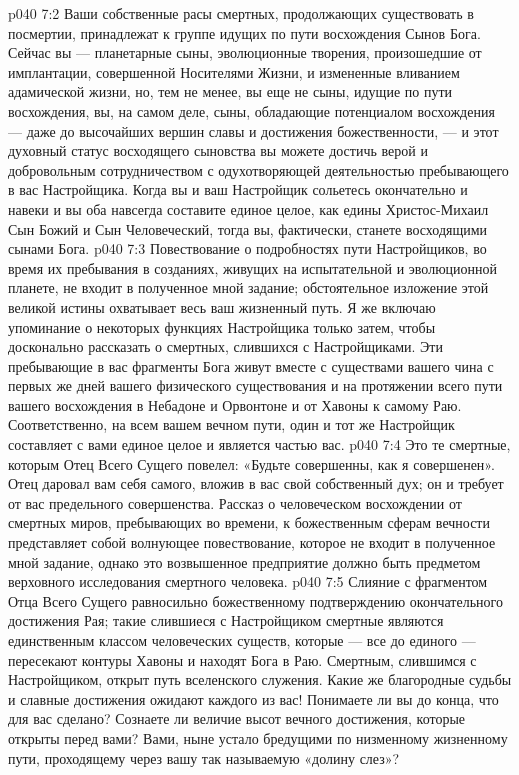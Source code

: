\vs p040 7:2 Ваши собственные расы смертных, продолжающих существовать в посмертии, принадлежат к группе идущих по пути восхождения Сынов Бога. Сейчас вы --- планетарные сыны, эволюционные творения, произошедшие от имплантации, совершенной Носителями Жизни, и измененные вливанием адамической жизни, но, тем не менее, вы еще не сыны, идущие по пути восхождения, вы, на самом деле, сыны, обладающие потенциалом восхождения --- даже до высочайших вершин славы и достижения божественности, --- и этот духовный статус восходящего сыновства вы можете достичь верой и добровольным сотрудничеством с одухотворяющей деятельностью пребывающего в вас Настройщика. Когда вы и ваш Настройщик сольетесь окончательно и навеки и вы оба навсегда составите единое целое, как едины Христос\hyp{}Михаил Сын Божий и Сын Человеческий, тогда вы, фактически, станете восходящими сынами Бога.
\vs p040 7:3 Повествование о подробностях пути Настройщиков, во время их пребывания в созданиях, живущих на испытательной и эволюционной планете, не входит в полученное мной задание; обстоятельное изложение этой великой истины охватывает весь ваш жизненный путь. Я же включаю упоминание о некоторых функциях Настройщика только затем, чтобы досконально рассказать о смертных, слившихся с Настройщиками. Эти пребывающие в вас фрагменты Бога живут вместе с существами вашего чина с первых же дней вашего физического существования и на протяжении всего пути вашего восхождения в Небадоне и Орвонтоне и от Хавоны к самому Раю. Соответственно, на всем вашем вечном пути, один и тот же Настройщик составляет с вами единое целое и является частью вас.
\vs p040 7:4 Это те смертные, которым Отец Всего Сущего повелел: «Будьте совершенны, как я совершенен». Отец даровал вам себя самого, вложив в вас свой собственный дух;  он и требует от вас предельного совершенства. Рассказ о человеческом восхождении от смертных миров, пребывающих во времени, к божественным сферам вечности представляет собой волнующее повествование, которое не входит в полученное мной задание, однако это возвышенное предприятие должно быть предметом верховного исследования смертного человека.
\vs p040 7:5 Слияние с фрагментом Отца Всего Сущего равносильно божественному подтверждению окончательного достижения Рая; такие слившиеся с Настройщиком смертные являются единственным классом человеческих существ, которые --- все до единого --- пересекают контуры Хавоны и находят Бога в Раю. Смертным, слившимся с Настройщиком, открыт путь вселенского служения. Какие же благородные судьбы и славные достижения ожидают каждого из вас! Понимаете ли вы до конца, что для вас сделано? Сознаете ли величие высот вечного достижения, которые открыты перед вами? Вами, ныне устало бредущими по низменному жизненному пути, проходящему через вашу так называемую «долину слез»?
